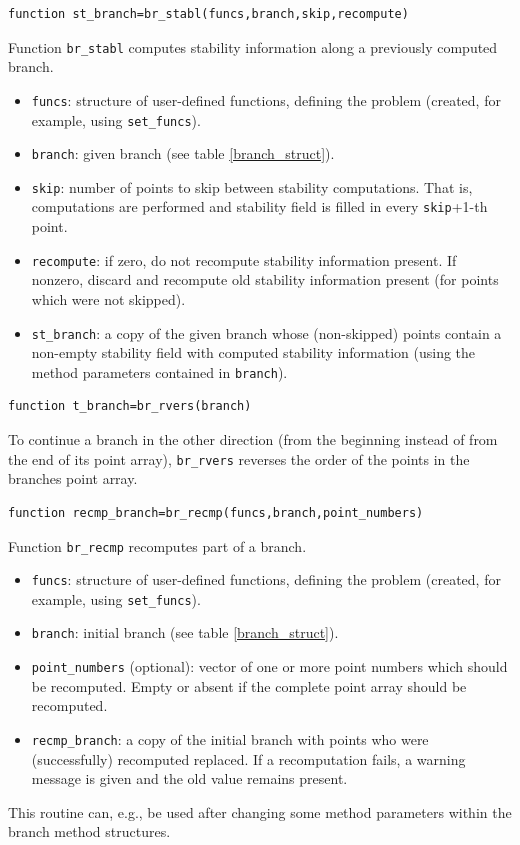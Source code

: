 \documentclass[10pt]{scrartcl}
\newcommand{\blist}[1]{\mbox{\lstinline!#1!}}
\begin{document}
{\begin{lstlisting}
function st_branch=br_stabl(funcs,branch,skip,recompute)  
\end{lstlisting}
\noindent Function \blist{br_stabl} computes stability information
along a previously computed branch. 
\begin{itemize}
\item \blist{funcs}: structure of user-defined functions, defining the
  problem (created, for example, using \blist{set_funcs}).
\item \blist{branch}: given branch (see table \ref{branch_struct}).
\item \blist{skip}: number of points to skip between stability
  computations.  That is, computations are performed and stability
  field is filled in every \blist{skip}+1-th point.
\item \blist{recompute}: if zero, do not recompute stability
  information present. If nonzero, discard and recompute old stability
  information present (for points which were not skipped).
\item \blist{st_branch}: a copy of the given branch whose
  (non-skipped) points contain a non-empty stability field with
  computed stability information (using the method parameters
  contained in \blist{branch}).
\end{itemize}

\begin{lstlisting}
function t_branch=br_rvers(branch)  
\end{lstlisting}
\noindent To continue a branch in the other direction (from the
beginning instead of from the end of its point array),
\blist{br_rvers} reverses the order of the points in the branches
point array.

\begin{lstlisting} 
function recmp_branch=br_recmp(funcs,branch,point_numbers) 
\end{lstlisting}
\noindent Function \blist{br_recmp} recomputes part of a branch.
\begin{itemize}
\item \blist{funcs}: structure of user-defined functions, defining the
  problem (created, for example, using \blist{set_funcs}).
\item \blist{branch}: initial branch (see table \ref{branch_struct}).
\item \blist{point_numbers} (optional): vector of one or more point
  numbers which should be recomputed. Empty or absent if the complete
  point array should be recomputed.
\item \blist{recmp_branch}: a copy of the initial branch with points
  who were (successfully) recomputed replaced. If a recomputation
  fails, a warning message is given and the old value remains present.
\end{itemize}
This routine can, e.g., be used after changing some method parameters
within the branch method structures.

}
\end{document}
